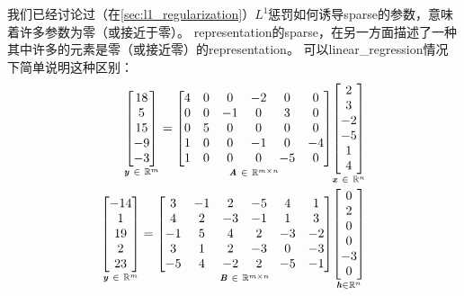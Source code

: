 我们已经讨论过（在\ref{sec:l1_regularization}）$L^1$惩罚如何诱导\gls{sparse}的参数，意味着许多参数为零（或接近于零）。
\gls{representation}的\gls{sparse}，在另一方面描述了一种其中许多的元素是零（或接近零）的\gls{representation}。
可以\gls{linear_regression}情况下简单说明这种区别：
\begin{align}
\underset{\boldsymbol{\mathit{y}} ~\in~ \mathbb{R}^m}{
 \begin{bmatrix}
  18 \\  5 \\ 15 \\ -9 \\ -3
 \end{bmatrix}} = 
 \underset{\boldsymbol{\mathit{A}} ~\in~ \mathbb{R}^{m \times n}}{
 \begin{bmatrix}
  4 & 0 & 0 & -2 & 0 & 0 \\
  0 & 0 & -1 & 0 & 3 & 0 \\
  0 & 5 & 0 & 0 & 0 & 0 \\
  1 & 0 & 0 & -1 & 0 & -4 \\
  1 & 0 & 0 & 0 & -5 & 0
 \end{bmatrix}} 
  \underset{\boldsymbol{\mathit{x}} ~\in~ \mathbb{R}^n}{
  \begin{bmatrix}
 2 \\ 3\\ -2\\ -5 \\ 1 \\ 4
 \end{bmatrix} }\\
 \underset{\boldsymbol{\mathit{y}} ~\in~ \mathbb{R}^m}{
 \begin{bmatrix}
  -14 \\  1 \\ 19 \\  2 \\ 23
 \end{bmatrix}} = 
 \underset{\boldsymbol{\mathit{B}} ~\in~ \mathbb{R}^{m \times n}}{
 \begin{bmatrix}
  3 & -1 & 2 & -5 & 4 & 1 \\
  4 & 2 & -3 & -1 & 1 & 3 \\
  -1 & 5 & 4 & 2 & -3 & -2 \\
  3 & 1 & 2 & -3 & 0 & -3 \\
  -5 & 4 & -2 & 2 & -5 & -1
 \end{bmatrix}} 
  \underset{\boldsymbol{\mathit{h}} \in \mathbb{R}^n}{
  \begin{bmatrix}
 0 \\ 2 \\ 0 \\ 0 \\ -3 \\ 0
 \end{bmatrix} }
\end{align}

